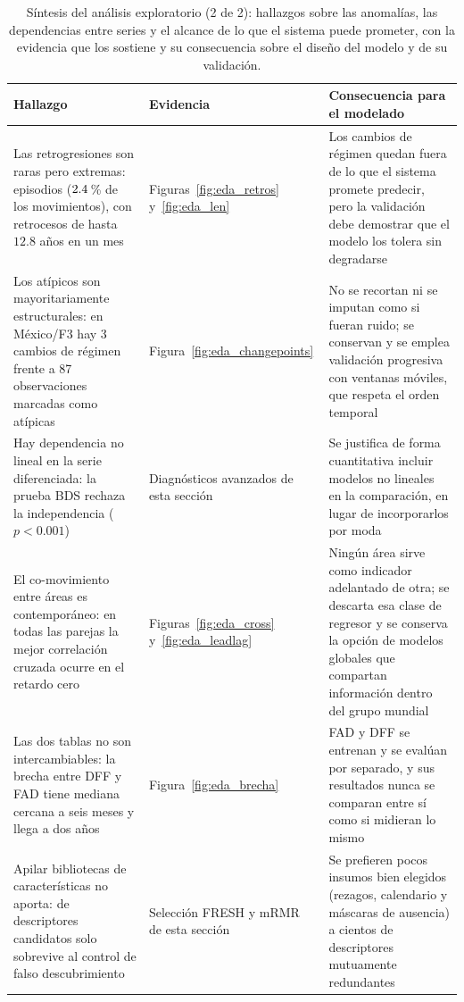 \documentclass[12pt,letterpaper]{report}
\begin{document}
\begin{table}[H]
\centering
\footnotesize
\caption[Síntesis del análisis exploratorio (2 de 2)]{Síntesis del análisis exploratorio
(2 de 2): hallazgos sobre las anomalías, las dependencias entre series y el alcance de lo
que el sistema puede prometer, con la evidencia que los sostiene y su consecuencia sobre el
diseño del modelo y de su validación.}
\label{tab:eda_sintesis2}
\begin{tabular}{>{\raggedright\arraybackslash}p{3.8cm}>{\raggedright\arraybackslash}p{3.1cm}>{\raggedright\arraybackslash}p{6.5cm}}
\toprule
\rowcolor{uacjblue!15}
\textbf{Hallazgo} & \textbf{Evidencia} & \textbf{Consecuencia para el modelado} \\ \midrule
Las retrogresiones son raras pero extremas: \factNRetroEvents{} episodios
($2.4$\,\% de los movimientos), con retrocesos de hasta $12.8$ años en un mes &
Figuras~\ref{fig:eda_retros} y~\ref{fig:eda_len} &
Los cambios de régimen quedan fuera de lo que el sistema promete predecir, pero la validación
debe demostrar que el modelo los tolera sin degradarse \\
Los atípicos son mayoritariamente estructurales: en México/F3 hay 3 cambios de régimen frente
a 87 observaciones marcadas como atípicas &
Figura~\ref{fig:eda_changepoints} &
No se recortan ni se imputan como si fueran ruido; se conservan y se emplea validación
progresiva con ventanas móviles, que respeta el orden temporal \\
Hay dependencia no lineal en la serie diferenciada: la prueba BDS rechaza la independencia
($p<0.001$) &
Diagnósticos avanzados de esta sección &
Se justifica de forma cuantitativa incluir modelos no lineales en la comparación, en lugar de
incorporarlos por moda \\
El co-movimiento entre áreas es contemporáneo: en todas las parejas la mejor correlación
cruzada ocurre en el retardo cero &
Figuras~\ref{fig:eda_cross} y~\ref{fig:eda_leadlag} &
Ningún área sirve como indicador adelantado de otra; se descarta esa clase de regresor y se
conserva la opción de modelos globales que compartan información dentro del grupo mundial \\
Las dos tablas no son intercambiables: la brecha entre DFF y FAD tiene mediana cercana a seis
meses y llega a dos años &
Figura~\ref{fig:eda_brecha} &
FAD y DFF se entrenan y se evalúan por separado, y sus resultados nunca se comparan entre sí
como si midieran lo mismo \\
Apilar bibliotecas de características no aporta: de \feFactSelIn{} descriptores candidatos
solo \feFactSelRelevant{} sobrevive al control de falso descubrimiento &
Selección FRESH y mRMR de esta sección &
Se prefieren pocos insumos bien elegidos (rezagos, calendario y máscaras de ausencia) a
cientos de descriptores mutuamente redundantes \\
\bottomrule
\end{tabular}
\end{table}
\end{document}
